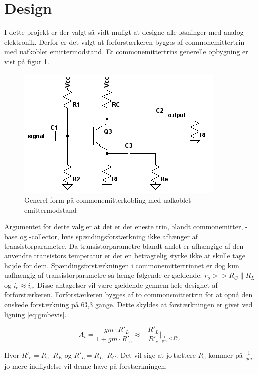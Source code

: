 \section{Design}
I dette projekt er der valgt så vidt muligt at designe alle løsninger med analog elektronik. Derfor er det valgt at forforstærkeren bygges af commonemittertrin med uafkoblet emittermodstand. Et commonemittertrins generelle opbygning er vist på figur \ref{fig:cekobling}.

\begin{figure}[h]
\centering
\includegraphics[scale=.6]{teknisk/forforstaerker/ceopkobling.png}
\caption{Generel form på commonemitterkobling med uafkoblet emittermodstand}
\label{fig:cekobling}
\end{figure}


Argumentet for dette valg er at det er det eneste trin, blandt commonemitter, -base og -collector, hvis spændingsforstærkning ikke afhænger af transistorparametre. Da transistorparametre blandt andet er afhængige af den anvendte transistors temperatur er det en betragtelig styrke ikke at skulle tage højde for dem. Spændingsforstærkningen i commonemittertrinnet er dog kun uafhængig af transistorparametre så længe følgende er gældende: $r_o >>R_C \| R_L$ og $i_e \approx i_c$.
Disse antagelser vil være gældende gennem hele designet af forforstærkeren. 
Forforstærkeren bygges af to commonemittertrin for at opnå den ønskede forstærkning på 63,3 gange. Dette skyldes at forstærkningen er givet ved ligning \ref{eq:gmbevis}.

\begin{equation}
A_v =  \frac{-gm \cdot R'_L}{1+gm \cdot R'_e} \approx  -\frac{R'_L}{R'_e} \Biggr\vert _{\frac{1}{gm}<R'_e}
\label{eq:gmbevis}
\end{equation}

Hvor $R'_e = R_e || R_E$ og $R'_L = R_L||R_C$. Det vil sige at jo tættere $R_e$ kommer på $\frac{1}{gm}$ jo mere indflydelse vil denne have på forstærkningen.

